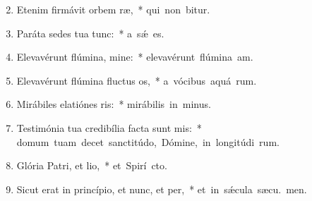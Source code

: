 \begin{flushleft}
\begin{enumerate}[leftmargin=*]
\setcounter{enumi}{1}


\item Etenim firmávit orbem ræ,~* \mbox{qui non bitur.}
\item Paráta sedes tua  tunc:~* \mbox{a s\'{\ae}  es.}
\item Elevavérunt flúmina, mine:~* \mbox{elevavérunt flúmina  am.}
\item Elevavérunt flúmina fluctus os,~* \mbox{a vócibus aquá rum.}
\item Mirábiles elatiónes ris:~* \mbox{mirábilis in  minus.}
\item Testimónia tua credibília facta sunt mis:~* \mbox{domum tuam decet sanctitúdo, Dómine, in longitúdi rum.}
\item Glória Patri, et lio,~* \mbox{et Spirí cto.}
\item Sicut erat in princípio, et nunc, et per,~* \mbox{et in s\'{\ae}cula sæcu. men.}

\end{enumerate}
\end{flushleft}

